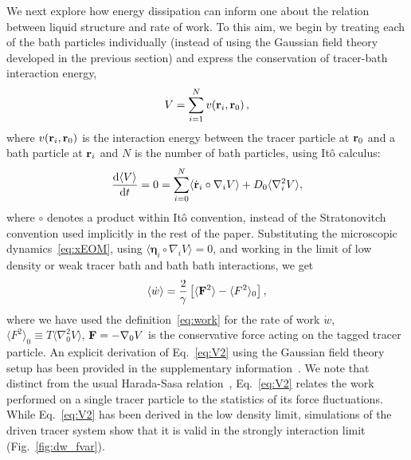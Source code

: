 \documentclass[pre, superscriptaddress, twocolumn,pre]{revtex4-1}
\newcommand{\dd}{\text{d}}
\begin{document}
We next explore how energy dissipation can inform one about the relation between liquid structure and rate of work. To this aim, we begin by treating each of the bath particles individually (instead of using the Gaussian field theory developed in the previous section) and express the conservation of tracer-bath interaction energy, 
\begin{equation}
V=\sum_{i=1}^{N} v({\bf r}_i,{\bf r}_0)\,,
\label{eq:Vdef}
\end{equation}where $v({\bf r}_i,{\bf r}_0)$ is the interaction energy between the tracer particle at ${\bf r}_0$ and a bath particle at ${\bf r}_i$ and $N$ is the number of bath particles, using It\^o calculus:
\begin{equation}\label{eq:V1}
	\frac{\dd\langle V\rangle}{\dd t} = 0 =\sum_{i=0}^N \langle\dot{\bf r}_i\circ\nabla_iV\rangle + D_0 \langle\nabla_i^2V\rangle ,
\end{equation}
where $\circ$ denotes a product within It\^o convention, instead of the Stratonovitch convention used implicitly in the rest of the paper. Substituting the microscopic dynamics~\eqref{eq:xEOM}, using $\langle{\boldsymbol\eta_i}\circ\nabla_i V\rangle=0$, and working in the limit of low density or weak tracer bath and bath bath interactions, we get 
\begin{equation}\label{eq:V2}
	\langle \dot w\rangle = \frac{2}{\gamma} \left[ \langle{\bf F}^2 \rangle-\langle F^2\rangle_0\right] ,
\end{equation}
where we have used the definition~\eqref{eq:work} for the rate of work $\dot w$, $\langle F^2\rangle_0 \equiv T \langle\nabla^2_0 V\rangle$, ${\bf F}=-\nabla_0 V$ is the conservative force acting on the tagged tracer particle. An explicit derivation of Eq.~\ref{eq:V2} using the Gaussian field theory setup has been provided in the supplementary information~\cite{Supplemental}. 
We note that distinct from the usual Harada-Sasa relation~\cite{Harada2005,Harada2006}, Eq.~\ref{eq:V2} relates the work performed on a single tracer particle to the statistics of its force fluctuations. While Eq.~\ref{eq:V2} has been derived in the low density limit, simulations of the driven tracer system show that it is valid in the strongly interaction limit (Fig.~\ref{fig:dw_fvar}). 
\end{document}
